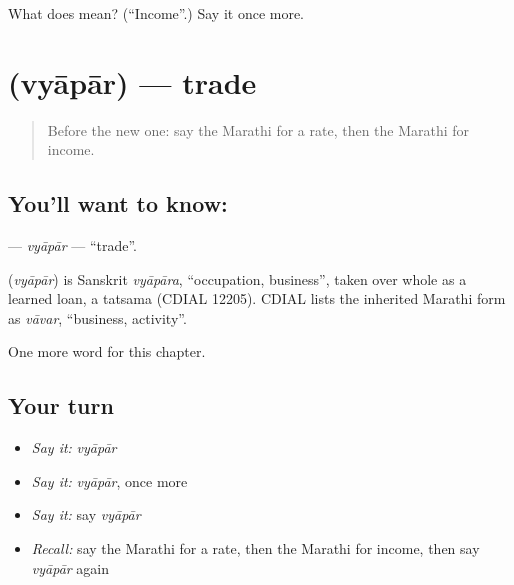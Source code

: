 \begin{tcolorbox}[breakable,colback=teal!4,colframe=teal!35!black,title={Before you move on}]
What does  mean? (\textquotedblleft{}Income\textquotedblright{}.) Say it once more.
\end{tcolorbox}
\section[\texorpdfstring{\mr{व्यापार} (vyāpār)}{व्यापार (vyāpār)}]{ (vyāpār) — trade}

\label{lesson:MR-C219-vyapar}



\begin{quote}
Before the new one: say the Marathi for a rate, then the Marathi for income.
\end{quote}

\subsection*{You'll want to know: }
\textbf{} — \emph{vyāpār} — \textquotedblleft{}trade\textquotedblright{}.

\begin{cousinweb}
\textbf{} (\emph{vyāpār}) is Sanskrit \emph{vyāpāra}, \textquotedblleft{}occupation, business\textquotedblright{}, taken over whole as a learned loan, a tatsama (CDIAL 12205). CDIAL lists the inherited Marathi form as \emph{vāvar}, \textquotedblleft{}business, activity\textquotedblright{}.
\end{cousinweb}

\begin{grammarlens}[title={What you've built}]
One more word for this chapter.
\end{grammarlens}

\subsection*{Your turn}
\begin{itemize}
\raggedright
  \item \emph{Say it:} \emph{vyāpār}
  \item \emph{Say it:} \emph{vyāpār}, once more
  \item \emph{Say it:} say \emph{vyāpār}
  \item \emph{Recall:} say the Marathi for a rate, then the Marathi for income, then say \emph{vyāpār} again
\end{itemize}

